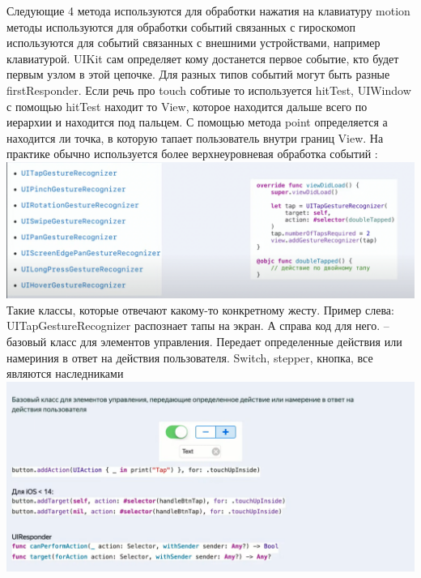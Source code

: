 \documentclass{article}
\begin{document}
    \newline
    Следующие 4 метода используются для обработки нажатия на клавиатуру
    \newline
    motion методы используются для обработки событий связанных с гироскомоп
    \newline
     используются для событий связанных с внешними устройствами, например клавиатурой. 
    \newline
    UIKit сам определяет кому достанется первое событие, кто будет первым узлом в этой цепочке. Для разных типов событий могут быть разные firstResponder.
    \newline
    Если речь про touch собтиые то используется hitTest, UIWindow с помощью hitTest находит то View, которое находится дальше всего по иерархии и находится под пальцем. С помощью метода point определяется а находится ли точка, в которую тапает пользователь внутри границ View.
    \newline
    На практике обычно используется более верхнеуровневая обработка событий :
    \includegraphics[scale = 0.2]{pic/Снимок экрана 2023-08-01 в 00.30.09.png}
    \newline
    Такие классы, которые отвечают какому-то конкретному жесту. Пример слева: UITapGestureRecognizer распознает тапы на экран. А справа код для него. 
    \newline
     -- базовый класс для элементов управления. Передает определенные действия или намериния в ответ на действия пользователя. Switch, stepper, кнопка, все являются наследниками 
    \newline
    \includegraphics[scale = 0.2]{pic/Снимок экрана 2023-08-01 в 00.33.25.png}
\end{document}
